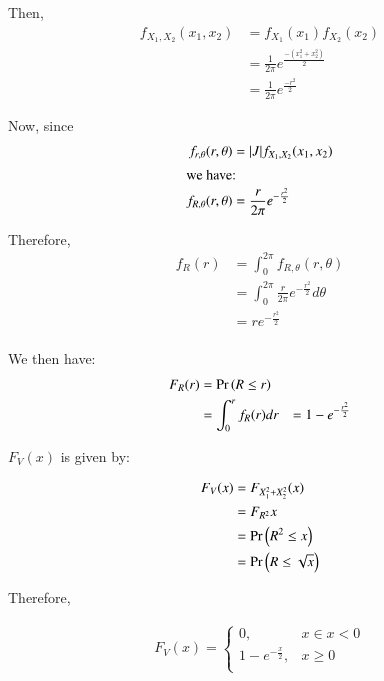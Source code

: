 \documentclass[journal,12pt,twocolumn]{IEEEtran}
\renewcommand\thesection{\arabic{section}}
\begin{document}
\begin{enumerate}[label=\thesection.\arabic*
,ref=\thesection.\theenumi]
Then, 
\begin{align}
    f_{X_1,X_2}(x_1,x_2) &= f_{X_1}(x_1)f_{X_2}(x_2) \\
    &= \frac{1}{2\pi} e^{\frac{-(x_1^2+x_2^2)}{2}} \\
    &= \frac{1}{2\pi} e^{\frac{-r^2}{2}}
\end{align}

Now, since 
\begin{align}
    f_{r, \theta}(r, \theta) &= |J|f_{X_1, X_2}(x_1, x_2)      \\   
\intertext{we have:}     
f_{R, \theta}(r, \theta) & = \frac{r}{2\pi} e^{-\frac{r^2}{2}}                                                    
\end{align}

Therefore, 
\begin{align}
    f_R(r)                   & = \int_0^{2\pi} f_{R, \theta}(r, \theta)                                                     \\
    & = \int_0^{2\pi} \frac{r}{2\pi} e^{-\frac{r^2}{2}} d\theta                                    \\
    & = r e^{-\frac{r^2}{2}}                                                                       \\
\end{align}

We then have:
\begin{align}
    F_R(r) &= \Pr\left(R \leq r\right) \\
    &= \int _{0} ^r f_R(r) dr
    &= 1 - e^{-\frac{r^2}{2}}
\end{align}

$F_V(x)$ is given by:

\begin{align}
    F_V(x) &= F_{X_1^2+X_2^2}(x) \\
    &= F_{R^2}{x} \\
    &= \Pr\left(R^2 \leq x\right) \\
    &= \Pr\left(R \leq \sqrt{x}\right) 
\end{align}

Therefore, 


\begin{align}
    F_V(x) = 
    \begin{cases}
        0, & x \in x < 0 \\
        1 - e^{-\frac{x}{2}}, & x \geq  0\\
    \end{cases}
\end{align}


\end{enumerate}
\end{document}
